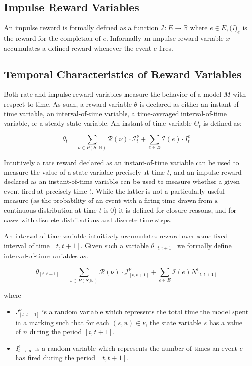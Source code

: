 \documentclass[11pt]{article}
\begin{document}
\subsection{Impulse Reward Variables}

An impulse reward is formally defined as a function $\mathcal{I}: E \rightarrow \mathbb{R}$ where $e \in E, \mathcal(I)_e$ is the reward for the completion of $e$.  Informally an impulse reward variable $x$ accumulates a defined reward whenever the event $e$ fires.

\subsection{Temporal Characteristics of Reward Variables}

Both rate and impulse reward variables measure the behavior of a model $M$ with respect to time.  As such, a reward variable $\theta$ is declared as either an instant-of-time variable, an interval-of-time variable, a time-averaged interval-of-time variable, or a steady state variable.  An instant of time variable $\Theta_t$ is defined as:

\[ \theta_t = \sum_{\nu \in P(S, \mathbb{N})} \mathcal{R}(\nu) \cdot \mathcal{I}^{\nu}_t + \sum_{e \in E} \mathcal{I}(e) \cdot I_t^e\]

Intuitively a rate reward declared as an instant-of-time variable \cite{freire1990technique} can be used to measure the value of a state variable precisely at time $t$, and an impulse reward declared as an instant-of-time variable can be used to measure whether a given event fired at precisely time $t$.  While the latter is not a particularly useful measure (as the probability of an event with a firing time drawn from a continuous distribution at time $t$ is $0$) it is defined for closure reasons, and for cases with discrete distributions and discrete time steps.

An interval-of-time variable intuitively accumulates reward over some fixed interval of time $[t, t+1]$.  Given such a variable $\theta_{[t, t+1]}$ we formally define interval-of-time variables as:

\[\theta_{[t,t+1]} = \sum_{\nu \in P(S, \mathbb{N})} \mathcal{R}(\nu) \cdot \mathcal{J}^{\nu}_{[t, t+1]} + \sum_{e \in E} \mathcal{I}(e)N^e_{[t,t+1]}\]

where

\begin{itemize}
\item $J^{\nu}_{[t,t+1]}$ is a random variable which represents the total time the model spent in a marking such that for each $(s, n) \in \nu$, the state variable $s$ has a value of $n$ during the period $[t, t+1]$.
\item $I^e_{t\rightarrow\infty}$ is a random variable which represents the number of times an event $e$ has fired during the period $[t, t+1]$.
\end{itemize}
\end{document}
